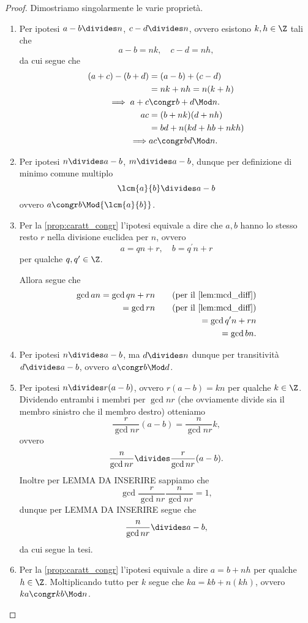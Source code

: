 \begin{proof}
    Dimostriamo singolarmente le varie proprietà.
    \begin{enumerate}[label={(\arabic*)}]
        \item Per ipotesi $a - b \divides n$, $c - d \divides n$, ovvero esistono $k, h \in \Z$ tali che \[
            a - b = nk, \quad c - d = nh,    
        \] da cui segue che 
        \begin{alignat*}{1}
            (a + c) - (b + d) &= (a - b) + (c - d) \\
            &= nk + nh = n(k+h) \\
            \implies a+c &\congr b+d \Mod n.\\
            ac &= (b + nk)(d +nh)\\
             &= bd + n(kd + hb + nkh) \\
            \implies &ac \congr bd \Mod n.
        \end{alignat*}
        \item Per ipotesi $n \divides a-b$, $m\divides a - b$, dunque per definizione di minimo comune multiplo \[
            \lcm{a}{b} \divides a - b    
        \] ovvero $a \congr b \Mod{\lcm{a}{b}}$.
        \item Per la \autoref{prop:caratt_congr} l'ipotesi equivale a dire che $a, b$ hanno lo stesso resto $r$ nella divisione euclidea per $n$, ovvero \[
            a = qn + r, \quad b = q^\prime n + r    
        \] per qualche $q, q^\prime \in \Z$.

        Allora segue che \begin{align*}
            \gcd{a}{n} = \gcd{qn + r}{n} \tag{per il \autoref{lem:mcd_diff}}\\
            = \gcd{r}{n} \tag{per il \autoref{lem:mcd_diff}}\\
            = \gcd{q^\prime n + r}{n}\\ 
            = \gcd{b}{n}.
        \end{align*}
        \item Per ipotesi $n \divides a - b$, ma $d \divides n$ dunque per transitività $d \divides a - b$, ovvero $a \congr b \Mod d$.
        \item Per ipotesi $n \divides r(a - b)$, ovvero $r(a-b) = kn$ per qualche $k \in \Z$. Dividendo entrambi i membri per $\gcd{n}{r}$ (che ovviamente divide sia il membro sinistro che il membro destro) otteniamo \[
            \frac{r}{\gcd{n}{r}}(a-b) = \frac{n}{\gcd{n}{r}}k,   
        \] ovvero \[
            \frac{n}{\gcd{n}{r}} \divides \frac{r}{\gcd{n}{r}}(a-b).
        \] Inoltre per LEMMA DA INSERIRE sappiamo che \[
            \gcd{\frac{r}{\gcd{n}{r}}}{\frac{n}{\gcd{n}{r}}} = 1,    
        \] dunque per LEMMA DA INSERIRE segue che \[
            \frac{n}{\gcd{n}{r}} \divides a - b,    
        \] da cui segue la tesi.
        \item Per la \autoref{prop:caratt_congr} l'ipotesi equivale a dire $a = b + nh$ per qualche $h \in \Z$. Moltiplicando tutto per $k$ segue che $ka = kb + n(kh)$, ovvero $ka \congr kb \Mod n$.
    \end{enumerate}
\end{proof}

